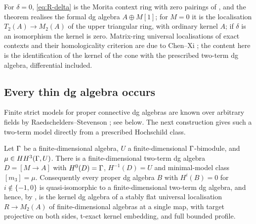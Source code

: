 \begin{remark}\label{rem:realisation-benchmarks}
For \(\delta=0\), \eqref{eq:R-delta} is the Morita context ring with zero pairings of \cite{GreenPsaroudakis14,GaoPsaroudakis17}, and the theorem realises the formal dg algebra \(A\oplus M[1]\); for \(M=0\) it is the localisation \(T_2(A)\to M_2(A)\) of the upper triangular ring, with ordinary kernel \(A\); if \(\delta\) is an isomorphism the kernel is zero.  Matrix-ring universal localisations of exact contexts and their homologicality criterion are due to Chen--Xi \cite{ChenXi19}; the content here is the identification of the kernel of the cone with the prescribed two-term dg algebra, differential included.
\end{remark}

\subsection{Every thin dg algebra occurs}

Finite strict models for proper connective dg algebras are known over arbitrary fields by Raedschelders--Stevenson \cite[Appendix~A, Theorem~A.3]{Goodbody24}; see  below.  The next construction gives such a two-term model directly from a prescribed Hochschild class.

\begin{theorem}\label{thm:finite-crossed}
Let \(\Gamma\) be a finite-dimensional algebra, \(U\) a finite-dimensional \(\Gamma\)-bimodule, and \(\mu\in HH^3(\Gamma,U)\).  There is a finite-dimensional two-term dg algebra \(D=[M\to A]\) with \(H^0(D)=\Gamma\), \(H^{-1}(D)=U\) and minimal-model class \([m_3]=\mu\).  Consequently every proper dg algebra \(B\) with \(H^i(B)=0\) for \(i\notin\{-1,0\}\) is quasi-isomorphic to a finite-dimensional two-term dg algebra, and hence, by , is the kernel dg algebra of a stably flat universal localisation \(R\to M_2(A)\) of finite-dimensional algebras at a single map, with target projective on both sides, t-exact kernel embedding, and full bounded profile.
\end{theorem}

